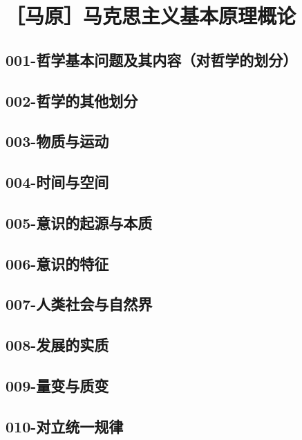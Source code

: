 \section{［马原］马克思主义基本原理概论}

\subsection{001-哲学基本问题及其内容（对哲学的划分）}

\subsection{002-哲学的其他划分}

\subsection{003-物质与运动}

\subsection{004-时间与空间}

\subsection{005-意识的起源与本质}

\subsection{006-意识的特征}

\subsection{007-人类社会与自然界}

\subsection{008-发展的实质}

\subsection{009-量变与质变}

\subsection{010-对立统一规律}

